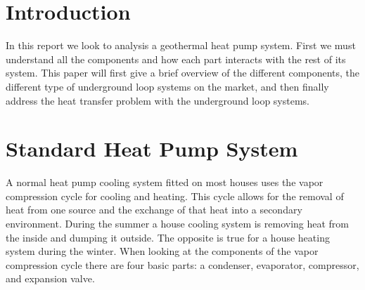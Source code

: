 \section{Introduction}
In this report we look to analysis a geothermal heat pump system. First we must understand all the components and how each part interacts with the rest of its system. This paper will first give a brief overview of the different components, the different type of underground loop systems on the market, and then finally address the heat transfer problem with the underground loop systems.
%
\section{Standard Heat Pump System}
A normal heat pump cooling system fitted on most houses uses the vapor compression cycle for cooling and heating. This cycle allows for the removal of heat from one source and the exchange of that heat into a secondary environment. During the summer a house cooling system is removing heat from the inside and dumping it outside. The opposite is true for a house heating system during the winter. When looking at the components of the vapor compression cycle there are four basic parts: a condenser, evaporator, compressor, and expansion valve.
%
\begin{figure}[!tbph]
  \centering
  \hfill
\end{figure}
